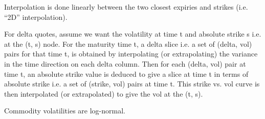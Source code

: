 Interpolation is done linearly between the two closest expiries and strikes (i.e. 
``2D'' interpolation).

For delta quotes, assume we want the volatility at time t and absolute strike s i.e. at the (t, s) node. For the maturity time t, a delta slice i.e. a set of (delta, vol) pairs for that time t, is obtained by interpolating (or extrapolating) the variance in the time direction on each delta column. Then for each (delta, vol) pair at time t, an absolute strike value is deduced to give a slice at time t in terms of absolute strike i.e. a set of (strike, vol) pairs at time t. This strike vs. vol curve is then interpolated (or extrapolated) to give the vol at the (t, s).

\medskip
Commodity volatilities are log-normal.

